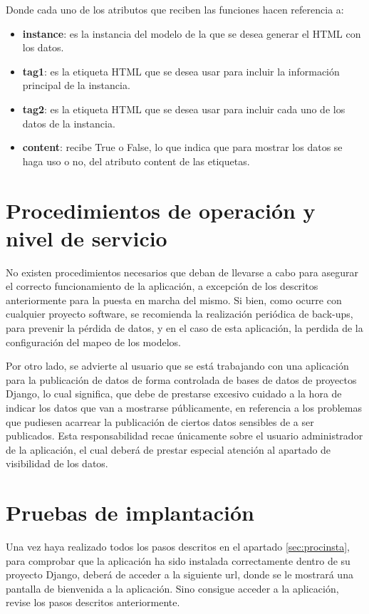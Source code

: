Donde cada uno de los atributos que reciben las funciones hacen referencia a:
\begin{itemize}
    \item \textbf{instance}: es la instancia del modelo de la que se desea
        generar el HTML con los datos.
    \item \textbf{tag1}: es la etiqueta HTML que se desea usar para incluir la
        información principal de la instancia.
    \item \textbf{tag2}: es la etiqueta HTML que se desea usar para incluir cada
        uno de los datos de la instancia.
    \item \textbf{content}: recibe True o False, lo que indica que para mostrar
        los datos se haga uso o no, del atributo content de las etiquetas.
\end{itemize}



\section{Procedimientos de operación y nivel de servicio}

No existen procedimientos necesarios que deban de llevarse a cabo para asegurar
el correcto funcionamiento de la aplicación, a excepción de los descritos
anteriormente para la puesta en marcha del mismo. Si bien, como ocurre con
cualquier proyecto software, se recomienda la realización periódica de back-ups,
para prevenir la pérdida de datos, y en el caso de esta aplicación, la perdida
de la configuración del mapeo de los modelos.

Por otro lado, se advierte al usuario que se está trabajando con una aplicación
para la publicación de datos de forma controlada de bases de datos de proyectos
Django, lo cual significa, que debe de prestarse excesivo cuidado a la hora de
indicar los datos que van a mostrarse públicamente, en referencia a los
problemas que pudiesen acarrear la publicación de ciertos datos sensibles de a
ser publicados. Esta responsabilidad recae únicamente sobre el usuario
administrador de la aplicación, el cual deberá de prestar especial atención al
apartado de visibilidad de los datos.


\section{Pruebas de implantación}

Una vez haya realizado todos los pasos descritos en el apartado
\ref{sec:procinsta}, para comprobar que la aplicación ha sido instalada
correctamente dentro de su proyecto Django, deberá de acceder a la siguiente
url, donde se le mostrará una pantalla de bienvenida a la aplicación. Sino
consigue acceder a la aplicación, revise los pasos descritos anteriormente.

